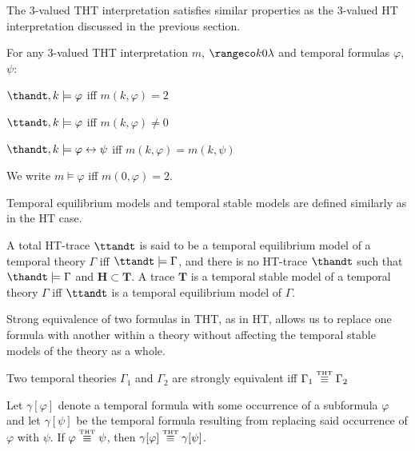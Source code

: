 The 3-valued THT interpretation satisfies similar properties as the
3-valued HT interpretation discussed in the previous section.

\begin{proposition}
  For any 3-valued THT interpretation $m$, $\kinlambda$ and temporal
  formulas $\varphi$, $\psi$:
\begin{description}
  \item $\thandt,k \models \varphi$ iff $m(k,\varphi) = 2$
  \item $\ttandt,k \models \varphi$ iff $m(k,\varphi) \neq 0$
  \item $\thandt,k \models \varphi \leftrightarrow \psi$ iff $m(k,\varphi) = m(k,\psi)$
\end{description}
\end{proposition}

We write $m \models \varphi$ iff $m(0,\varphi)=2$.

Temporal equilibrium models and temporal stable models are defined
similarly as in the HT case.

\begin{definition}
  A total HT-trace $\ttandt$ is said to be a temporal equilibrium
  model of a temporal theory $\Gamma$ iff $\ttandt \models \Gamma$,
  and there is no HT-trace $\thandt$ such that $\thandt \models \Gamma$ and
  $\bm{H} \subset \bm{T}$. A trace $\bm{T}$ is a temporal stable model of a temporal theory $\Gamma$ iff
  $\ttandt$ is a temporal equilibrium model of $\Gamma$.
\end{definition}

Strong equivalence of two formulas in THT, as in HT, allows us to
replace one formula with another within a theory without affecting the
temporal stable models of the theory as a whole.

\begin{proposition}
  Two temporal theories $\Gamma_1$ and $\Gamma_2$ are strongly equivalent
  iff $\Gamma_1 \stackrel{\normalfont\mbox{\tiny THT}}{\equiv} \Gamma_2$
\end{proposition}

\begin{proposition}
  Let $\gamma[\varphi]$ denote a temporal formula with some occurrence of a
  subformula $\varphi$ and let $\gamma[\psi]$ be the temporal formula resulting
  from replacing said occurrence of $\varphi$ with $\psi$. If
  $\varphi \stackrel{\normalfont\mbox{\tiny THT}}{\equiv} \psi$, then $\gamma[\varphi] \stackrel{\normalfont\mbox{\tiny THT}}{\equiv} \gamma[\psi]$.
\end{proposition}
